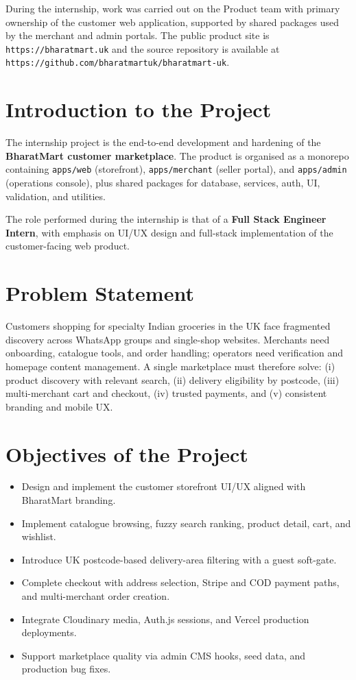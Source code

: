 \documentclass[12pt,a4paper]{report}
\begin{document}
During the internship, work was carried out on the Product team with primary
ownership of the customer web application, supported by shared packages used by
the merchant and admin portals. The public product site is
\texttt{https://bharatmart.uk} and the source repository is available at\\
\texttt{https://github.com/bharatmartuk/bharatmart-uk}.


\section{Introduction to the Project}

The internship project is the end-to-end development and hardening of the
\textbf{BharatMart customer marketplace}. The product is organised as a monorepo
containing \texttt{apps/web} (storefront), \texttt{apps/merchant} (seller portal),
and \texttt{apps/admin} (operations console), plus shared packages for database,
services, auth, UI, validation, and utilities.

The role performed during the internship is that of a \textbf{Full Stack Engineer
Intern}, with emphasis on UI/UX design and full-stack implementation of the
customer-facing web product.


\section{Problem Statement}

Customers shopping for specialty Indian groceries in the UK face fragmented
discovery across WhatsApp groups and single-shop websites. Merchants need
onboarding, catalogue tools, and order handling; operators need verification
and homepage content management. A single marketplace must therefore solve:
(i) product discovery with relevant search, (ii) delivery eligibility by
postcode, (iii) multi-merchant cart and checkout, (iv) trusted payments, and
(v) consistent branding and mobile UX.


\section{Objectives of the Project}

\begin{itemize}
    \item Design and implement the customer storefront UI/UX aligned with
    BharatMart branding.
    \item Implement catalogue browsing, fuzzy search ranking, product detail,
    cart, and wishlist.
    \item Introduce UK postcode-based delivery-area filtering with a guest
    soft-gate.
    \item Complete checkout with address selection, Stripe and COD payment
    paths, and multi-merchant order creation.
    \item Integrate Cloudinary media, Auth.js sessions, and Vercel production
    deployments.
    \item Support marketplace quality via admin CMS hooks, seed data, and
    production bug fixes.
\end{itemize}
\end{document}
